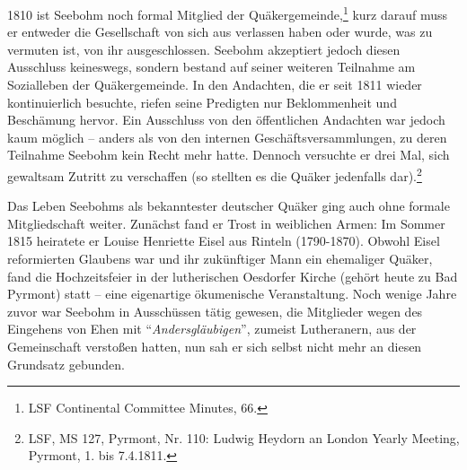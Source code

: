 \medskip

1810 ist Seebohm noch formal Mitglied der Quäkergemeinde,\footnote{LSF
Continental Committee Minutes, 66.} kurz darauf muss er entweder die
Gesellschaft von sich aus verlassen haben oder wurde, was zu vermuten ist, von
ihr ausgeschlossen. Seebohm akzeptiert jedoch diesen
Ausschluss keineswegs, sondern bestand auf seiner
weiteren Teilnahme am Sozialleben der Quäkergemeinde. In den Andachten, die er
seit 1811 wieder kontinuierlich besuchte, riefen seine Predigten nur
Beklommenheit und Beschämung hervor. Ein Ausschluss von den öffentlichen
Andachten war jedoch kaum möglich -- anders als von den internen
Geschäftsversammlungen, zu deren Teilnahme
Seebohm kein Recht mehr hatte. Dennoch versuchte er drei Mal, sich gewaltsam
Zutritt zu verschaffen (so stellten es die Quäker jedenfalls dar).\footnote{LSF,
MS 127, Pyrmont, Nr. 110: Ludwig Heydorn an London Yearly Meeting,
Pyrmont, 1. bis 7.4.1811.}

\medskip

Das Leben Seebohms als bekanntester deutscher Quäker ging auch ohne formale
Mitgliedschaft weiter. Zunächst fand er Trost in weiblichen Armen: Im Sommer
1815 heiratete er Louise Henriette Eisel aus Rinteln (1790-1870). Obwohl Eisel
reformierten Glaubens war und ihr zukünftiger Mann ein ehemaliger Quäker, fand
die Hochzeitsfeier in der lutherischen Oesdorfer Kirche (gehört heute zu Bad
Pyrmont) statt -- eine eigenartige ökumenische
Veranstaltung. Noch wenige Jahre zuvor war Seebohm in Ausschüssen tätig gewesen,
die Mitglieder wegen des Eingehens von Ehen mit
"`\textit{Andersgläubigen}"', zumeist
Lutheranern, aus der Gemeinschaft
verstoßen hatten, nun sah er sich selbst nicht mehr an diesen
Grundsatz gebunden.

\medskip

